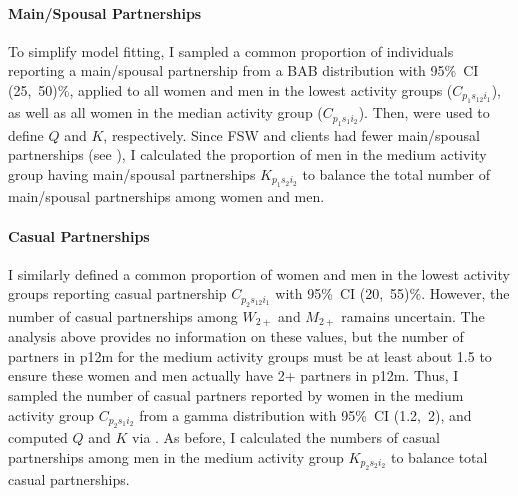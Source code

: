 \paragraph{Main/Spousal Partnerships}
To simplify model fitting, I sampled a common proportion of
individuals reporting a main/spousal partnership from a BAB distribution with 95\%~CI (25,~50)\%,
applied to all women and men in the lowest activity groups ($C_{p_{1}s_{12}i_{1}}$),
as well as all women in the median activity group ($C_{p_{1}s_{1}i_{2}}$).
Then,  were used to define $Q$ and $K$, respectively.
Since FSW and clients had fewer main/spousal partnerships (see ),
I calculated the proportion of men in the medium activity group having main/spousal partnerships
$K_{p_{1}s_{2}i_{2}}$ to balance the total number of main/spousal partnerships among women and men.
\paragraph{Casual Partnerships}
I similarly defined a common proportion of women and men in the lowest activity groups
reporting casual partnership $C_{p_{2}s_{12}i_{1}}$ with 95\%~CI (20,~55)\%.
However, the number of casual partnerships among $W_{2+}$ and $M_{2+}$ ramains uncertain.
The analysis above provides no information on these values,
but the number of partners in p12m for the medium activity groups must be at least about 1.5
to ensure these women and men actually have 2+ partners in p12m.
Thus, I sampled the number of casual partners reported by women in the medium activity group
$C_{p_{2}s_{1}i_{2}}$ from a gamma distribution with 95\%~CI (1.2,~2),
and computed $Q$ and $K$ via .
As before, I calculated the numbers of casual partnerships among men in the medium activity group
$K_{p_{2}s_{2}i_{2}}$ to balance total casual partnerships.
